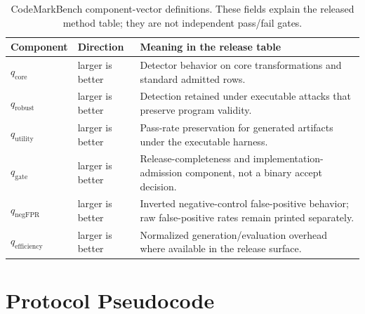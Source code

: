 \begin{table}[htbp]
\centering
\caption{CodeMarkBench component-vector definitions. These fields explain the released method table; they are not independent pass/fail gates.}
\label{tab:codemarkbench-components-app}
\tighttable
\begin{tabularx}{\textwidth}{@{}L{1.90cm}L{2.20cm}Y@{}}
\toprule
Component & Direction & Meaning in the release table \\
\midrule
$q_{\mathrm{core}}$ & larger is better & Detector behavior on core transformations and standard admitted rows. \\
$q_{\mathrm{robust}}$ & larger is better & Detection retained under executable attacks that preserve program validity. \\
$q_{\mathrm{utility}}$ & larger is better & Pass-rate preservation for generated artifacts under the executable harness. \\
$q_{\mathrm{gate}}$ & larger is better & Release-completeness and implementation-admission component, not a binary accept decision. \\
$q_{\mathrm{negFPR}}$ & larger is better & Inverted negative-control false-positive behavior; raw false-positive rates remain printed separately. \\
$q_{\mathrm{efficiency}}$ & larger is better & Normalized generation/evaluation overhead where available in the release surface. \\
\bottomrule
\end{tabularx}
\end{table}
\FloatBarrier

\section{Protocol Pseudocode}

